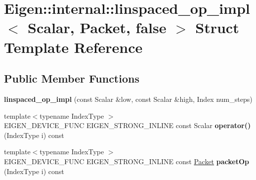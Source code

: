 \hypertarget{struct_eigen_1_1internal_1_1linspaced__op__impl_3_01_scalar_00_01_packet_00_01false_01_4}{}\section{Eigen\+::internal\+::linspaced\+\_\+op\+\_\+impl$<$ Scalar, Packet, false $>$ Struct Template Reference}
\label{struct_eigen_1_1internal_1_1linspaced__op__impl_3_01_scalar_00_01_packet_00_01false_01_4}
\subsection*{Public Member Functions}
\begin{DoxyCompactItemize}
\item 
\mbox{\label{struct_eigen_1_1internal_1_1linspaced__op__impl_3_01_scalar_00_01_packet_00_01false_01_4_a0ef567342fc3d2ffc7667de9fbb147ef}} 
{\bfseries linspaced\+\_\+op\+\_\+impl} (const Scalar \&low, const Scalar \&high, Index num\+\_\+steps)
\item 
\mbox{\label{struct_eigen_1_1internal_1_1linspaced__op__impl_3_01_scalar_00_01_packet_00_01false_01_4_afea6cee796a7dfb63c34d888457ac12b}} 
{\footnotesize template$<$typename Index\+Type $>$ }\\E\+I\+G\+E\+N\+\_\+\+D\+E\+V\+I\+C\+E\+\_\+\+F\+U\+NC E\+I\+G\+E\+N\+\_\+\+S\+T\+R\+O\+N\+G\+\_\+\+I\+N\+L\+I\+NE const Scalar {\bfseries operator()} (Index\+Type i) const
\item 
\mbox{\label{struct_eigen_1_1internal_1_1linspaced__op__impl_3_01_scalar_00_01_packet_00_01false_01_4_abfaac1602220b86936bf2a11fc7c3767}} 
{\footnotesize template$<$typename Index\+Type $>$ }\\E\+I\+G\+E\+N\+\_\+\+D\+E\+V\+I\+C\+E\+\_\+\+F\+U\+NC E\+I\+G\+E\+N\+\_\+\+S\+T\+R\+O\+N\+G\+\_\+\+I\+N\+L\+I\+NE const \mbox{\hyperlink{union_eigen_1_1internal_1_1_packet}{Packet}} {\bfseries packet\+Op} (Index\+Type i) const
\end{DoxyCompactItemize}
